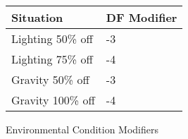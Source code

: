\begin{SHTable}[h]
	\begin{tabular}{ll}

	Situation			& DF Modifier	\\
	\hline
	Lighting 50\% off	& -3			\\
	Lighting 75\% off	& -4			\\
	Gravity 50\% off	& -3			\\		   
	Gravity 100\% off	& -4			\\

    \end{tabular}
	\caption{Environmental Condition Modifiers}
\end{SHTable}

